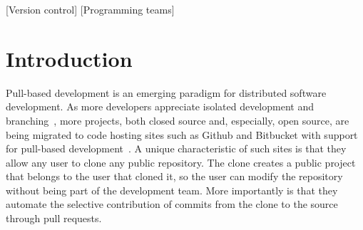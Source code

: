 \documentclass{sig-alternate}
\begin{document}
[Version control]
[Programming teams]



\section{Introduction}

%

Pull-based development is an emerging paradigm for distributed software
development. As more developers appreciate isolated
development and branching~\cite{Bird12}, more projects, both closed source and,
especially, open source, are being migrated to code hosting sites such as Github
and Bitbucket with support for pull-based development~\cite{Barr12}. A unique
characteristic of such sites is that they allow any user to clone any public
repository. The clone creates a public project that belongs to the user that
cloned it, so the user can modify the repository without being part of the
development team. More importantly is that they automate the selective
contribution of commits from the clone to the source through pull requests. 
\end{document}
